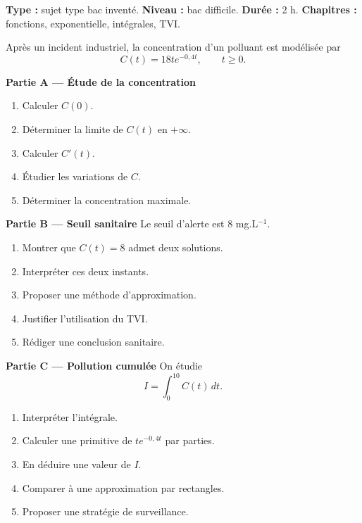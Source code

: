 \documentclass[11pt,a4paper]{article}
\begin{document}
\hypertarget{M-LONG-05}{}
\begin{sujettype}
\textbf{Type :} sujet type bac inventé.  
\textbf{Niveau :} bac difficile.  
\textbf{Durée :} 2 h.  
\textbf{Chapitres :} fonctions, exponentielle, intégrales, TVI.

Après un incident industriel, la concentration d'un polluant est modélisée par
\[
C(t)=18te^{-0{,}4t},\qquad t\geq0.
\]

\textbf{Partie A — Étude de la concentration}
\begin{enumerate}
  \item Calculer $C(0)$.
  \item Déterminer la limite de $C(t)$ en $+\infty$.
  \item Calculer $C'(t)$.
  \item Étudier les variations de $C$.
  \item Déterminer la concentration maximale.
\end{enumerate}

\textbf{Partie B — Seuil sanitaire}
Le seuil d'alerte est 8 mg.L$^{-1}$.
\begin{enumerate}
  \item Montrer que $C(t)=8$ admet deux solutions.
  \item Interpréter ces deux instants.
  \item Proposer une méthode d'approximation.
  \item Justifier l'utilisation du TVI.
  \item Rédiger une conclusion sanitaire.
\end{enumerate}

\textbf{Partie C — Pollution cumulée}
On étudie
\[
I=\int_0^{10}C(t)\,dt.
\]
\begin{enumerate}
  \item Interpréter l'intégrale.
  \item Calculer une primitive de $te^{-0{,}4t}$ par parties.
  \item En déduire une valeur de $I$.
  \item Comparer à une approximation par rectangles.
  \item Proposer une stratégie de surveillance.
\end{enumerate}
\end{sujettype}
\end{document}

